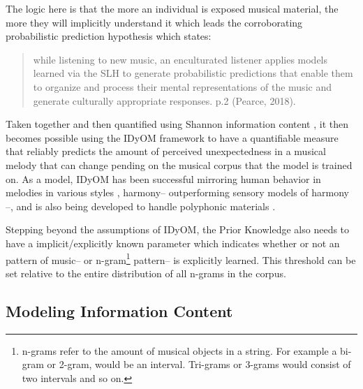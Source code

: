 \documentclass[]{book}
\let\rmarkdownfootnote\footnote%
\def\footnote{\protect\rmarkdownfootnote}
\begin{document}
The logic here is that the more an individual is exposed musical material, the more they will implicitly understand it which leads the corroborating probabilistic prediction hypothesis which states:

\begin{quote}
while listening to new music, an enculturated listener applies models learned via the SLH to generate probabilistic predictions that enable them to organize and process their mental representations of the music and generate culturally appropriate responses. p.2 (Pearce, 2018).
\end{quote}

Taken together and then quantified using Shannon information content \citep{shannonMathematicalTheoryCommunication1948}, it then becomes possible using the IDyOM framework to have a quantifiable measure that reliably predicts the amount of perceived unexpectedness in a musical melody that can change pending on the musical corpus that the model is trained on.
As a model, IDyOM has been successful mirroring human behavior in melodies in various styles \citep{pearceStatisticalLearningProbabilistic2018a}, harmony-- outperforming \citep{harrisonDissociatingSensoryCognitive2018} sensory models of harmony \citep{bigandEmpiricalEvidenceMusical2014}--, and is also being developed to handle polyphonic materials \citep{sauvePredictionPolyphonyModelling2017}.

Stepping beyond the assumptions of IDyOM, the Prior Knowledge also needs to have a implicit/explicitly known parameter which indicates whether or not an pattern of music-- or n-gram\footnote{n-grams refer to the amount of musical objects in a string. For example a bi-gram or 2-gram, would be an interval. Tri-grams or 3-grams would consist of two intervals and so on.} pattern-- is explicitly learned.
This threshold can be set relative to the entire distribution of all n-grams in the corpus.

\hypertarget{modeling-information-content}{%
\subsection{Modeling Information Content}\label{modeling-information-content}}
\end{document}
